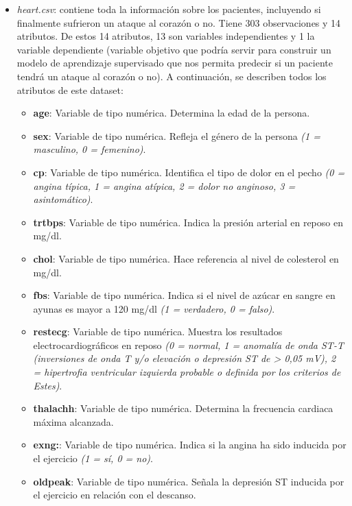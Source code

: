 \documentclass[
]{article}
\begin{document}
\begin{itemize}
\item
  \emph{heart.csv}: contiene toda la información sobre los pacientes,
  incluyendo si finalmente sufrieron un ataque al corazón o no. Tiene
  303 observaciones y 14 atributos. De estos 14 atributos, 13 son
  variables independientes y 1 la variable dependiente (variable
  objetivo que podría servir para construir un modelo de aprendizaje
  supervisado que nos permita predecir si un paciente tendrá un ataque
  al corazón o no). A continuación, se describen todos los atributos de
  este dataset:

  \begin{itemize}
  \item
    \textbf{age}: Variable de tipo numérica. Determina la edad de la
    persona.
  \item
    \textbf{sex}: Variable de tipo numérica. Refleja el género de la
    persona \emph{(1 = masculino, 0 = femenino)}.
  \item
    \textbf{cp}: Variable de tipo numérica. Identifica el tipo de dolor
    en el pecho \emph{(0 = angina típica, 1 = angina atípica, 2 = dolor
    no anginoso, 3 = asintomático)}.
  \item
    \textbf{trtbps}: Variable de tipo numérica. Indica la presión
    arterial en reposo en mg/dl.
  \item
    \textbf{chol}: Variable de tipo numérica. Hace referencia al nivel
    de colesterol en mg/dl.
  \item
    \textbf{fbs}: Variable de tipo numérica. Indica si el nivel de
    azúcar en sangre en ayunas es mayor a 120 mg/dl \emph{(1 =
    verdadero, 0 = falso)}.
  \item
    \textbf{restecg}: Variable de tipo numérica. Muestra los resultados
    electrocardiográficos en reposo \emph{(0 = normal, 1 = anomalía de
    onda ST-T (inversiones de onda T y/o elevación o depresión ST de
    \textgreater{} 0,05 mV), 2 = hipertrofia ventricular izquierda
    probable o definida por los criterios de Estes)}.
  \item
    \textbf{thalachh}: Variable de tipo numérica. Determina la
    frecuencia cardiaca máxima alcanzada.
  \item
    \textbf{exng:}: Variable de tipo numérica. Indica si la angina ha
    sido inducida por el ejercicio \emph{(1 = sí, 0 = no)}.
  \item
    \textbf{oldpeak}: Variable de tipo numérica. Señala la depresión ST
    inducida por el ejercicio en relación con el descanso.

\end{itemize}
\end{itemize}
\end{document}
